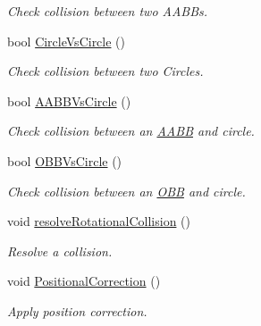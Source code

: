 \begin{DoxyCompactItemize}
\begin{DoxyCompactList}\small\item\em Check collision between two A\+A\+B\+Bs. \end{DoxyCompactList}\item 
\hypertarget{class_collision_manifold2_d_a3f9c9ef16199d2ed12ff50bd7b5cccac}{bool \hyperlink{class_collision_manifold2_d_a3f9c9ef16199d2ed12ff50bd7b5cccac}{Circle\+Vs\+Circle} ()}\label{class_collision_manifold2_d_a3f9c9ef16199d2ed12ff50bd7b5cccac}

\begin{DoxyCompactList}\small\item\em Check collision between two Circles. \end{DoxyCompactList}\item 
\hypertarget{class_collision_manifold2_d_a48419f339540ce108582ed1ba28021a7}{bool \hyperlink{class_collision_manifold2_d_a48419f339540ce108582ed1ba28021a7}{A\+A\+B\+B\+Vs\+Circle} ()}\label{class_collision_manifold2_d_a48419f339540ce108582ed1ba28021a7}

\begin{DoxyCompactList}\small\item\em Check collision between an \hyperlink{class_a_a_b_b}{A\+A\+B\+B} and circle. \end{DoxyCompactList}\item 
\hypertarget{class_collision_manifold2_d_aac3dc83ebb8919c2ea37902dff315c93}{bool \hyperlink{class_collision_manifold2_d_aac3dc83ebb8919c2ea37902dff315c93}{O\+B\+B\+Vs\+Circle} ()}\label{class_collision_manifold2_d_aac3dc83ebb8919c2ea37902dff315c93}

\begin{DoxyCompactList}\small\item\em Check collision between an \hyperlink{class_o_b_b}{O\+B\+B} and circle. \end{DoxyCompactList}\item 
\hypertarget{class_collision_manifold2_d_ad6392d7e37396c279ec3f3bd926d1c1a}{void \hyperlink{class_collision_manifold2_d_ad6392d7e37396c279ec3f3bd926d1c1a}{resolve\+Rotational\+Collision} ()}\label{class_collision_manifold2_d_ad6392d7e37396c279ec3f3bd926d1c1a}

\begin{DoxyCompactList}\small\item\em Resolve a collision. \end{DoxyCompactList}\item 
\hypertarget{class_collision_manifold2_d_a427412801fdb0747a9f56923a87642f2}{void \hyperlink{class_collision_manifold2_d_a427412801fdb0747a9f56923a87642f2}{Positional\+Correction} ()}\label{class_collision_manifold2_d_a427412801fdb0747a9f56923a87642f2}

\begin{DoxyCompactList}\small\item\em Apply position correction. \end{DoxyCompactList}\end{DoxyCompactItemize}
